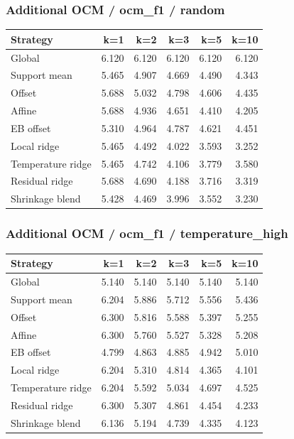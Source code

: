 \subsubsection*{Additional OCM / ocm\_f1 / random}
\begin{center}\small
\begin{tabular}{lrrrrr}
\toprule
Strategy & k=1 & k=2 & k=3 & k=5 & k=10 \\
\midrule
Global & 6.120 & 6.120 & 6.120 & 6.120 & 6.120 \\
Support mean & 5.465 & 4.907 & 4.669 & 4.490 & 4.343 \\
Offset & 5.688 & 5.032 & 4.798 & 4.606 & 4.435 \\
Affine & 5.688 & 4.936 & 4.651 & 4.410 & 4.205 \\
EB offset & 5.310 & 4.964 & 4.787 & 4.621 & 4.451 \\
Local ridge & 5.465 & 4.492 & 4.022 & 3.593 & 3.252 \\
Temperature ridge & 5.465 & 4.742 & 4.106 & 3.779 & 3.580 \\
Residual ridge & 5.688 & 4.690 & 4.188 & 3.716 & 3.319 \\
Shrinkage blend & 5.428 & 4.469 & 3.996 & 3.552 & 3.230 \\
\bottomrule
\end{tabular}
\end{center}

\subsubsection*{Additional OCM / ocm\_f1 / temperature\_high}
\begin{center}\small
\begin{tabular}{lrrrrr}
\toprule
Strategy & k=1 & k=2 & k=3 & k=5 & k=10 \\
\midrule
Global & 5.140 & 5.140 & 5.140 & 5.140 & 5.140 \\
Support mean & 6.204 & 5.886 & 5.712 & 5.556 & 5.436 \\
Offset & 6.300 & 5.816 & 5.588 & 5.397 & 5.255 \\
Affine & 6.300 & 5.760 & 5.527 & 5.328 & 5.208 \\
EB offset & 4.799 & 4.863 & 4.885 & 4.942 & 5.010 \\
Local ridge & 6.204 & 5.310 & 4.814 & 4.365 & 4.101 \\
Temperature ridge & 6.204 & 5.592 & 5.034 & 4.697 & 4.525 \\
Residual ridge & 6.300 & 5.307 & 4.861 & 4.454 & 4.233 \\
Shrinkage blend & 6.136 & 5.194 & 4.739 & 4.335 & 4.123 \\
\bottomrule
\end{tabular}
\end{center}
